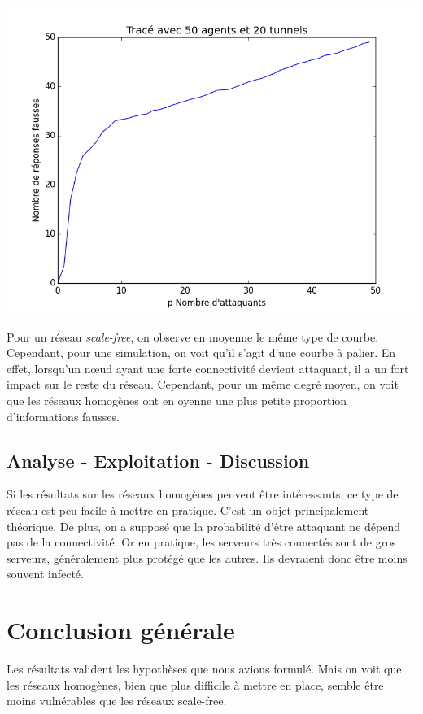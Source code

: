 \documentclass[11pt,a4paper]{article}
\begin{document}
\includegraphics[scale=0.3]{../resultats/atkaleat/atkaleat-50-20-1.png} 
	
	Pour un réseau \emph{scale-free}, on observe en moyenne le même type de courbe. Cependant, pour une simulation, on voit qu'il s'agit d'une courbe à palier. En effet, lorsqu'un nœud ayant une forte connectivité devient attaquant, il a un fort impact sur le reste du réseau.
	Cependant, pour un même degré moyen, on voit que les réseaux homogènes ont en oyenne une plus petite proportion d'informations fausses. 


\subsection{Analyse - Exploitation - Discussion}
	Si les résultats sur les réseaux homogènes peuvent être intéressants, ce type de réseau est peu facile à mettre en pratique. C'est un objet principalement théorique. De plus, on a supposé que la probabilité d'être attaquant ne dépend pas de la connectivité. Or en pratique, les serveurs très connectés sont de gros serveurs, généralement plus protégé que les autres. Ils devraient donc être moins souvent infecté.


\section{Conclusion générale} %

	Les résultats valident les hypothèses que nous avions formulé. Mais on voit que les réseaux homogènes, bien que plus difficile à mettre en place, semble être moins vulnérables que les réseaux scale-free. 
\end{document}
